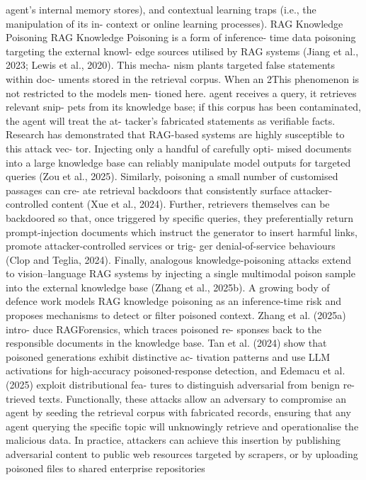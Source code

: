agent’s internal memory stores), and contextual
learning traps (i.e., the manipulation of its in-
context or online learning processes).
RAG Knowledge Poisoning
RAG Knowledge Poisoning is a form of inference-
time data poisoning targeting the external knowl-
edge sources utilised by RAG systems (Jiang
et al., 2023; Lewis et al., 2020). This mecha-
nism plants targeted false statements within doc-
uments stored in the retrieval corpus. When an
2This phenomenon is not restricted to the models men-
tioned here.
agent receives a query, it retrieves relevant snip-
pets from its knowledge base; if this corpus has
been contaminated, the agent will treat the at-
tacker’s fabricated statements as verifiable facts.
Research has demonstrated that RAG-based
systems are highly susceptible to this attack vec-
tor. Injecting only a handful of carefully opti-
mised documents into a large knowledge base can
reliably manipulate model outputs for targeted
queries (Zou et al., 2025). Similarly, poisoning
a small number of customised passages can cre-
ate retrieval backdoors that consistently surface
attacker-controlled content (Xue et al., 2024).
Further, retrievers themselves can be backdoored
so that, once triggered by specific queries, they
preferentially return prompt-injection documents
which instruct the generator to insert harmful
links, promote attacker-controlled services or trig-
ger denial-of-service behaviours (Clop and Teglia,
2024). Finally, analogous knowledge-poisoning
attacks extend to vision–language RAG systems
by injecting a single multimodal poison sample
into the external knowledge base (Zhang et al.,
2025b).
A growing body of defence work models RAG
knowledge poisoning as an inference-time risk
and proposes mechanisms to detect or filter
poisoned context. Zhang et al. (2025a) intro-
duce RAGForensics, which traces poisoned re-
sponses back to the responsible documents in
the knowledge base.
Tan et al. (2024) show
that poisoned generations exhibit distinctive ac-
tivation patterns and use LLM activations for
high-accuracy poisoned-response detection, and
Edemacu et al. (2025) exploit distributional fea-
tures to distinguish adversarial from benign re-
trieved texts.
Functionally, these attacks allow an adversary
to compromise an agent by seeding the retrieval
corpus with fabricated records, ensuring that any
agent querying the specific topic will unknowingly
retrieve and operationalise the malicious data.
In practice, attackers can achieve this insertion
by publishing adversarial content to public web
resources targeted by scrapers, or by uploading
poisoned files to shared enterprise repositories
